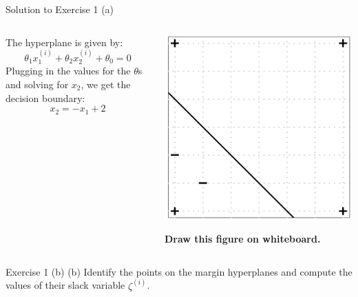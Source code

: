 \documentclass[aspectratio=169]{beamer}
\newcommand{\zetai}{\zeta^{(i)}}
\begin{document}
\begin{frame}{Solution to Exercise 1 (a)}

\begin{columns}[T]
	\begin{column}[t]{0.49\textwidth}
		The hyperplane is given by:
		$$ \theta_1 x_1^{(i)} + \theta_2 x_2^{(i)} + \theta_0 = 0$$
		Plugging in the values for the $\theta$s and solving for $x_2$, we get the decision boundary:
		$$x_2 = - x_1 + 2$$
	\end{column}

	\hfill
	\begin{column}{0.49\textwidth}
		\centering
		\includegraphics[width=0.6\columnwidth]{figures/ex_1_a_1.png}
		
		\textbf{Draw this figure on whiteboard.}
	\end{column}
\end{columns}
	
\end{frame}

\begin{frame}{Exercise 1 (b)}
	(b) Identify the points on the margin hyperplanes and compute the values of their slack variable $\zetai$.
\end{frame}
\end{document}
